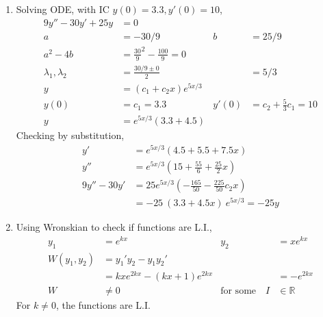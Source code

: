 \begin{enumerate}
    \item Solving ODE, with IC $ y(0) = 3.3, y'(0) = 10 $,
          \begin{align}
              9y'' - 30y' + 25y        & = 0                                                                              \\
              a                        & = -30/9                                & b     & = 25/9                          \\
              a^{2} - 4b               & = \frac{30}{9}^{2} - \frac{100}{9} = 0                                           \\
              \lambda_{1}, \lambda_{2} & = \frac{30/9 \pm 0}{2}                 &       & = 5/3                           \\
              y                        & = (c_{1}+ c_{2}x)e^{5x/3}                                                        \\
              y(0)                     & = c_{1} = 3.3                          & y'(0) & = c_{2} + \frac{5}{3}c_{1} = 10 \\
              y                        & = e^{5x/3}(3.3 + 4.5)
          \end{align}
          Checking by substitution,
          \begin{align}
              y'         & = e^{5x/3}\left( 4.5 + 5.5 + 7.5x \right)                           \\
              y''        & = e^{5x/3}\left( 15 + \frac{55}{6} + \frac{25}{2}x \right)          \\
              9y''- 30y' & = 25e^{5x/3}\left( - \frac{165}{50} - \frac{225}{50} c_{2}x \right) \\
                         & = -25\ (3.3 + 4.5x)\ e^{5x/3} = -25y
          \end{align}

    \item Using Wronskian to check if functions are L.I.,
          \begin{align}
              y_{1}           & = e^{kx}                      & y_{2}                   & = xe^{kx}      \\
              W(y_{1}, y_{2}) & = y_{1}'y_{2} - y_{1}y_{2}'                                              \\
                              & = kxe^{2kx} - (kx + 1)e^{2kx} &                         & =-e^{2kx}      \\
              W               & \neq 0                        & \text{for some} \quad I & \in \mathbb{R}
          \end{align}
          For $ k \neq 0 $, the functions are L.I.


\end{enumerate}

